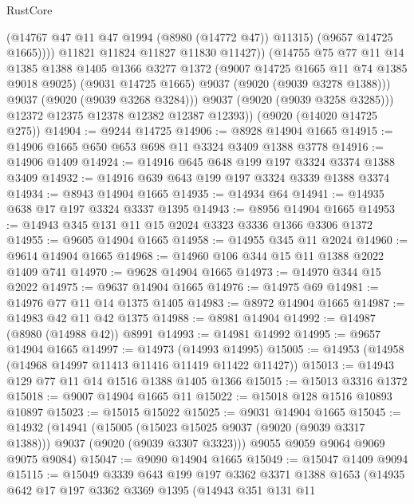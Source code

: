\begin{lexlean}{RustCore}
\begin{coremodule}
                      (@14767 @47 @11 @47 @1994 (@8980 (@14772 @47)) @11315)
                      (@9657 @14725 @1665))))
                @11821
                @11824
                @11827
                @11830
                @11427))
            (@14755
              @75
              @77
              @11
              @14
              @1385
              @1388
              @1405
              @1366
              @3277
              @1372
              (@9007 @14725 @1665 @11 @74 @1385 @9018 @9025)
              (@9031 @14725 @1665)
              @9037
              (@9020 (@9039 @3278 @1388)))
            @9037
            (@9020 (@9039 @3268 @3284)))
          @9037
          (@9020 (@9039 @3258 @3285)))
        @12372
        @12375
        @12378
        @12382
        @12387
        @12393))
    (@9020 (@14020 @14725 @275))
@14904 := @9244 @14725
@14906 := @8928 @14904 @1665
@14915 := @14906 @1665 @650 @653 @698 @11 @3324 @3409 @1388 @3778
@14916 := @14906 @1409
@14924 := @14916 @645 @648 @199 @197 @3324 @3374 @1388 @3409
@14932 := @14916 @639 @643 @199 @197 @3324 @3339 @1388 @3374
@14934 := @8943 @14904 @1665
@14935 := @14934 @64
@14941 := @14935 @638 @17 @197 @3324 @3337 @1395
@14943 := @8956 @14904 @1665
@14953 := @14943 @345 @131 @11 @15 @2024 @3323 @3336 @1366 @3306 @1372
@14955 := @9605 @14904 @1665
@14958 := @14955 @345 @11 @2024
@14960 := @9614 @14904 @1665
@14968 := @14960 @106 @344 @15 @11 @1388 @2022 @1409 @741
@14970 := @9628 @14904 @1665
@14973 := @14970 @344 @15 @2022
@14975 := @9637 @14904 @1665
@14976 := @14975 @69
@14981 := @14976 @77 @11 @14 @1375 @1405
@14983 := @8972 @14904 @1665
@14987 := @14983 @42 @11 @42 @1375
@14988 := @8981 @14904
@14992 := @14987 (@8980 (@14988 @42)) @8991
@14993 := @14981 @14992
@14995 := @9657 @14904 @1665
@14997 := @14973 (@14993 @14995)
@15005 := @14953 (@14958 (@14968 @14997 @11413 @11416 @11419 @11422 @11427))
@15013 := @14943 @129 @77 @11 @14 @1516 @1388 @1405 @1366
@15015 := @15013 @3316 @1372
@15018 := @9007 @14904 @1665 @11
@15022 := @15018 @128 @1516 @10893 @10897
@15023 := @15015 @15022
@15025 := @9031 @14904 @1665
@15045 := @14932
    (@14941
      (@15005 (@15023 @15025 @9037 (@9020 (@9039 @3317 @1388))) @9037 (@9020 (@9039 @3307 @3323)))
      @9055
      @9059
      @9064
      @9069
      @9075
      @9084)
@15047 := @9090 @14904 @1665
@15049 := @15047 @1409 @9094
@15115 := @15049
    @3339
    @643
    @199
    @197
    @3362
    @3371
    @1388
    @1653
    (@14935
      @642
      @17
      @197
      @3362
      @3369
      @1395
      (@14943
        @351
        @131
        @11

\end{coremodule}
\end{lexlean}
